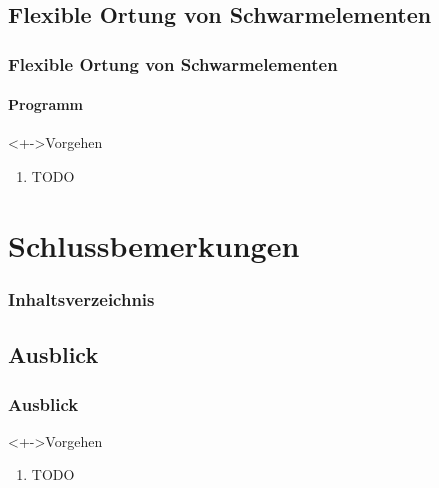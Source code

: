 \documentclass{beamer}
\begin{document}

\subsection[Flexible Ortung]{Flexible Ortung von Schwarmelementen}


\begin{frame}
	\frametitle{Flexible Ortung von Schwarmelementen}\framesubtitle{Programm}
	\begin{block}<+->{Vorgehen}
		\begin{enumerate}
		  \item TODO
		\end{enumerate}
	\end{block}
\end{frame}


\section[Fazit]{Schlussbemerkungen}


\begin{frame}\frametitle{Inhaltsverzeichnis}
\end{frame}


\subsection{Ausblick}


\begin{frame}
	\frametitle{Ausblick}
	\begin{block}<+->{Vorgehen}
		\begin{enumerate}
		  \item TODO
		\end{enumerate}
	\end{block}
\end{frame}
\end{document}
